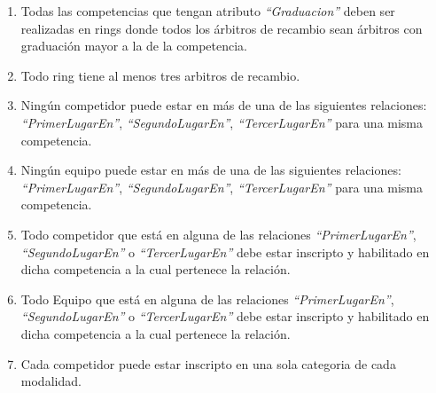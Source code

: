 \begin{enumerate}
    \item Todas las competencias que tengan atributo \textit{``Graduacion''} deben ser realizadas en rings donde todos los árbitros de recambio sean árbitros con graduación mayor a la de la competencia.
    \item Todo ring tiene al menos tres arbitros de recambio.
    \item Ningún competidor puede estar en más de una de las siguientes relaciones: \textit{``PrimerLugarEn''}, \textit{``SegundoLugarEn''}, \textit{``TercerLugarEn''} para una misma competencia.
    \item Ningún equipo puede estar en más de una de las siguientes relaciones: \textit{``PrimerLugarEn''}, \textit{``SegundoLugarEn''}, \textit{``TercerLugarEn''} para una misma competencia.
    \item Todo competidor que está en alguna de las relaciones \textit{``PrimerLugarEn''}, \textit{``SegundoLugarEn''} o \textit{``TercerLugarEn''} debe estar inscripto y habilitado en dicha competencia a la cual pertenece la relación.
    \item Todo Equipo que está en alguna de las relaciones \textit{``PrimerLugarEn''}, \textit{``SegundoLugarEn''} o \textit{``TercerLugarEn''} debe estar inscripto y habilitado en dicha competencia a la cual pertenece la relación.
    \item Cada competidor puede estar inscripto en una sola categoria de cada modalidad.
\end{enumerate}

